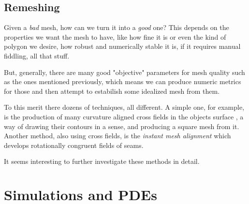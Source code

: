 \subsection{Remeshing}

Given a \emph{bad} mesh, how can we turn it into a \emph{good} one?
This depends on the properties we want the mesh to have, like how fine
it is or even the kind of polygon we desire, how robust and numerically
stable it is, if it requires manual fiddling, all that stuff.

\spa

But, generally, there are many good "objective" parameters for mesh quality
such as the ones mentioned previously, which means we can produce numeric
metrics for those and then attempt to estabilish some idealized mesh from them.

\spa

To this merit there dozens of techniques, all different. A simple one,
for example, is the production of many curvature aligned cross fields
in the objects surface \cite{remesh2}, 
a way of drawing their contours in a sense, and 
producing a square mesh from it. Another method, also using cross fields,
is the \emph{instant mesh alignment} \cite{remesh1} which develops
rotationally congruent fields of seams.

\spa

It seems interesting to further investigate these methods in detail.

\section{Simulations and PDEs}



